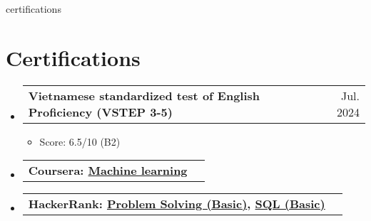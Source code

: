 \documentclass[letterpaper,11pt]{article}
\makeatletter
\newcommand{\heading}[4]{
    \normalsize
    \begin{tabular*}{0.97\textwidth}[t]{l@{\extracolsep{\fill}}r}
      \textbf{#1} & #2 \\[-2pt]
      \textit{\small#3} & \textit{\small #4}
    \end{tabular*}
    \vspace{-2pt}
}
\newcommand{\subheading}[2]{
    \normalsize
    \begin{tabular*}{0.97\textwidth}[t]{l@{\extracolsep{\fill}}r}
      \textbf{#1} & #2 \\
    \end{tabular*}
    \vspace{-2pt}
}
\makeatother
\begin{document}
\begin{filecontents*}[overwrite]{certifications}
    \section{Certifications}
    \begin{itemize}
        
        
    
    
        \item \subheading{Vietnamese standardized test of English Proficiency (VSTEP 3-5) }{Jul. 2024}
            \begin{itemize}
                \item Score: 6.5/10 (B2)
            \end{itemize}
        
        \item \subheading{Coursera: \normalfont \href{https://coursera.org/share/c68e20d03f93ad3689a80fc68a52989c}{Machine learning}}{}
        
        \item \subheading{HackerRank: \normalfont \href{https://www.hackerrank.com/certificates/6286b603c4f7}{Problem Solving (Basic)}, \href{https://www.hackerrank.com/certificates/0cbeca00b68c}{SQL (Basic)}}{}
    
    
    \end{itemize}
\end{filecontents*}



\end{document}
